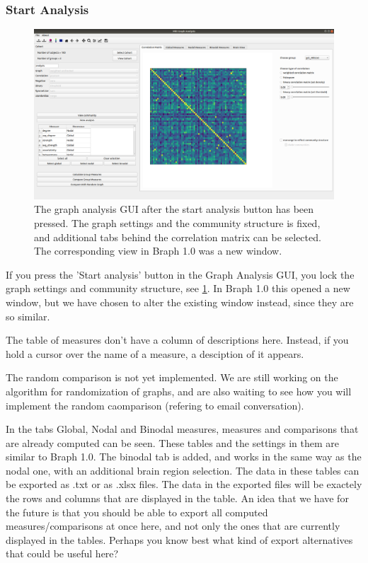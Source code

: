 \documentclass{article}
\begin{document}
\subsubsection{Start Analysis}

\begin{figure}[h]
    \centering
    \includegraphics[width=\linewidth]{start_analysis.png}
    \caption{The graph analysis GUI after the start analysis button has been pressed. The graph settings and the community structure is fixed, and additional tabs behind the correlation matrix can be selected. The corresponding view in Braph 1.0 was a new window.}
    \label{fig:start_analysis}
\end{figure}

If you press the 'Start analysis' button in the Graph Analysis GUI, you lock the graph settings and community structure, see \cref{fig:start_analysis}. In Braph 1.0 this opened a new window, but we have chosen to alter the existing window instead, since they are so similar. 

The table of measures don't have a column of descriptions here. Instead, if you hold a cursor over the name of a measure, a desciption of it appears. 

The random comparison is not yet implemented. We are still working on the algorithm for randomization of graphs, and are also waiting to see how you will implement the random caomparison (refering to email conversation).

In the tabs Global, Nodal and Binodal measures, measures and comparisons that are already computed can be seen. These tables and the settings in them are similar to Braph 1.0. The binodal tab is added, and works in the same way as the nodal one, with an additional brain region selection. The data in these tables can be exported as .txt or as .xlsx files. The data in the exported files will be exactely the rows and columns that are displayed in the table. An idea that we have for the future is that you should be able to export all computed measures/comparisons at once here, and not only the ones that are currently displayed in the tables. Perhaps you know best what kind of export alternatives that could be useful here?
\end{document}
